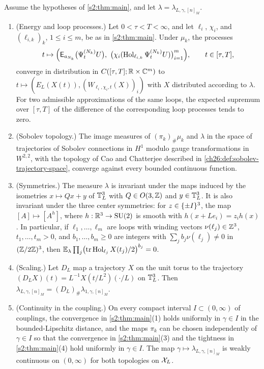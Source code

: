 \begin{theorem}\label{s2:thm:further}
Assume the hypotheses of \cref{s2:thm:main}, and let $\lambda=\lambda_{L,\gamma,[n]_M}$.
\begin{enumerate}
\item (Energy and loop processes.) Let $0<\tau<T<\infty$, and let $\ell_i$, $\chi_i$, and $(\ell_{i,k})_k$, $1\le i\le m$, be as in \cref{s2:thm:main}. Under $\mu_k$, the processes
\[
 t\mapsto\Bigl(\mathsf E_{a_{N_k}}\bigl(\Psi^{(N_k)}_tU\bigr),\ \bigl(\chi_i(\Hol_{\ell_{i,k}}\Psi^{(N_k)}_tU)\bigr)_{i=1}^m\Bigr),\qquad t\in[\tau,T],
\]
converge in distribution in $C([\tau,T];\mathbb R\times\mathbb C^m)$ to $t\mapsto(E_L(X(t)),(W_{\ell_i,\chi_i,t}(X))_i)$ with $X$ distributed according to $\lambda$. For two admissible approximations of the same loops, the expected supremum over $[\tau,T]$ of the difference of the corresponding loop processes tends to zero.
\item (Sobolev topology.) The image measures of $(\pi_k)_\#\mu_k$ and $\lambda$ in the space of trajectories of Sobolev connections in $H^1$ modulo gauge transformations in $W^{2,2}$, with the topology of Cao and Chatterjee described in \cref{ch26:def:sobolev-trajectory-space}, converge against every bounded continuous function.
\item (Symmetries.) The measure $\lambda$ is invariant under the maps induced by the isometries $x\mapsto Qx+y$ of $\mathbb T_L^3$ with $Q\in O(3,\mathbb Z)$ and $y\in\mathbb T_L^3$. It is also invariant under the three center symmetries: for $z\in\{\pm I\}^3$, the map $[A]\mapsto[A^{h}]$, where $h:\mathbb R^3\to\mathrm{SU}(2)$ is smooth with $h(x+Le_i)=z_ih(x)$. In particular, if $\ell_1,\dots,\ell_m$ are loops with winding vectors $\nu(\ell_j)\in\mathbb Z^3$, $t_1,\dots,t_m>0$, and $b_1,\dots,b_m\ge0$ are integers with $\sum_jb_j\nu(\ell_j)\ne0$ in $(\mathbb Z/2\mathbb Z)^3$, then $\mathbb E_\lambda\prod_j\bigl(\operatorname{tr}\operatorname{Hol}_{\ell_j}X(t_j)/2\bigr)^{b_j}=0$.
\item (Scaling.) Let $D_L$ map a trajectory $X$ on the unit torus to the trajectory $(D_LX)(t)=L^{-1}X(t/L^2)(\cdot/L)$ on $\mathbb T_L^3$. Then $\lambda_{L,\gamma,[n]_M}=(D_L)_\#\lambda_{1,\gamma,[n]_M}$.
\item (Continuity in the coupling.) On every compact interval $I\subset(0,\infty)$ of couplings, the convergence in \cref{s2:thm:main}(1) holds uniformly in $\gamma\in I$ in the bounded-Lipschitz distance, and the maps $\pi_k$ can be chosen independently of $\gamma\in I$ so that the convergence in \cref{s2:thm:main}(3) and the tightness in \cref{s2:thm:main}(4) hold uniformly in $\gamma\in I$. The map $\gamma\mapsto\lambda_{L,\gamma,[n]_M}$ is weakly continuous on $(0,\infty)$ for both topologies on $\mathcal X_L$.
\end{enumerate}
\end{theorem}

